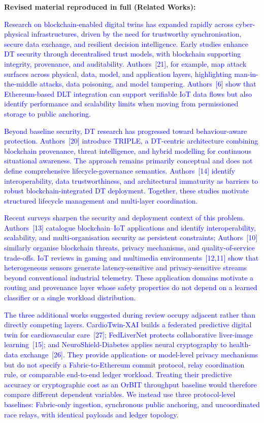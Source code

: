 \documentclass[11pt]{article}
\begin{document}
\medskip
\noindent\textbf{Revised material reproduced in full (Related Works):}

\textcolor{blue}{Research on blockchain-enabled digital twins has expanded rapidly across cyber-physical infrastructures, driven by the need for trustworthy synchronisation, secure data exchange, and resilient decision intelligence. Early studies enhance DT security through decentralised trust models, with blockchain supporting integrity, provenance, and auditability. Authors~[21], for example, map attack surfaces across physical, data, model, and application layers, highlighting man-in-the-middle attacks, data poisoning, and model tampering. Authors~[6] show that Ethereum-based DLT integration can support verifiable IoT data flows but also identify performance and scalability limits when moving from permissioned storage to public anchoring.}

\textcolor{blue}{Beyond baseline security, DT research has progressed toward behaviour-aware protection. Authors~[20] introduce TRIPLE, a DT-centric architecture combining blockchain provenance, threat intelligence, and hybrid modelling for continuous situational awareness. The approach remains primarily conceptual and does not define comprehensive lifecycle-governance semantics. Authors~[14] identify interoperability, data trustworthiness, and architectural immaturity as barriers to robust blockchain-integrated DT deployment. Together, these studies motivate structured lifecycle management and multi-layer coordination.}

\textcolor{blue}{Recent surveys sharpen the security and deployment context of this problem. Authors~[13] catalogue blockchain--IoT applications and identify interoperability, scalability, and multi-organisation security as persistent constraints; Authors~[10] similarly organise blockchain threats, privacy mechanisms, and quality-of-service trade-offs. IoT reviews in gaming and multimedia environments~[12,11] show that heterogeneous sensors generate latency-sensitive and privacy-sensitive streams beyond conventional industrial telemetry. These application domains motivate a routing and provenance layer whose safety properties do not depend on a learned classifier or a single workload distribution.}

\textcolor{blue}{The three additional works suggested during review occupy adjacent rather than directly competing layers. CardioTwin-XAI builds a federated predictive digital twin for cardiovascular care~[27]; FedLiverNet protects collaborative liver-image learning~[15]; and NeuroShield-Diabetes applies neural cryptography to health-data exchange~[26]. They provide application- or model-level privacy mechanisms but do not specify a Fabric-to-Ethereum commit protocol, relay coordination rule, or comparable end-to-end ledger workload. Treating their predictive accuracy or cryptographic cost as an OrBIT throughput baseline would therefore compare different dependent variables. We instead use three protocol-level baselines: Fabric-only ingestion, synchronous public anchoring, and uncoordinated race relays, with identical payloads and ledger topology.}
\end{document}
